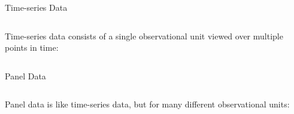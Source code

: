 \documentclass[aspectratio=169,t,11pt,table]{beamer}
\begin{document}
\begin{frame}{Time-series Data}
  \begin{columns}[T]
    \begin{column}{.4\textwidth}
      \alert{Time-series data} consists of a single observational unit viewed over multiple points in time:
    \end{column}
    \begin{column}{.6\textwidth}
      \vspace*{-\bigskipamount}
      
    \end{column}
  \end{columns}
\end{frame}

\begin{frame}{Panel Data}
  \begin{columns}[T]
    \begin{column}{.4\textwidth}
      \alert{Panel data} is like time-series data, but for many different observational units:
    \end{column}
    \begin{column}{.6\textwidth}
      \vspace*{-\bigskipamount}
      
    \end{column}
  \end{columns}
\end{frame}
\end{document}
